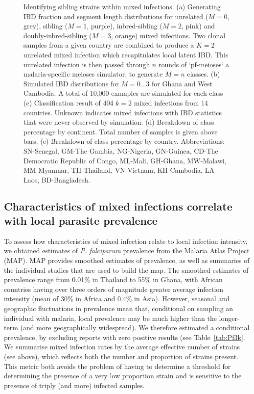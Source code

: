 \documentclass[9pt,lineno]{elife}
\begin{document}
\begin{figure}[h]
\begin{center}
   \caption{Identifying sibling strains within mixed infections.  (a) Generating IBD fraction and segment length distributions for unrelated ($M=0$, grey), sibling ($M=1$, purple), inbred-sibling ($M=2$, pink) and doubly-inbred-sibling ($M=3$, orange) mixed infections. Two clonal samples from a given country are combined to produce a $K=2$ unrelated mixed infection which recapitulates local latent IBD. This unrelated infection is then passed through $n$ rounds of `pf-meioses` a malaria-specific meioses simulator, to generate $M=n$ classes. (b) Simulated IBD distributions for $M=0...3$ for Ghana and West Cambodia. A total of 10,000 examples are simulated for each class (c) Classification result of 404 $k=2$ mixed infections from 14 countries. Unknown indicates mixed infections with IBD statistics that were never observed by simulation. (d) Breakdown of class percentage by continent. Total number of samples is given above bars. (e) Breakdown of class percentage by country. Abbreviations: SN-Senegal, GM-The Gambia, NG-Nigeria, GN-Guinea, CD-The Democratic Republic of Congo, ML-Mali, GH-Ghana, MW-Malawi, MM-Myanmar, TH-Thailand, VN-Vietnam, KH-Cambodia, LA-Laos, BD-Bangladesh.} \label{fig:classify}
   \end{center}
\end{figure}

\subsection{Characteristics of mixed infections correlate with local parasite prevalence}


To assess how characteristics of mixed infection relate to local infection intensity, we obtained estimates of {\it P. falciparum} prevalence from the Malaria Atlas Project (MAP).  MAP provides smoothed estimates of prevalence, as well as summaries of the individual studies that are used to build the map. The smoothed estimates of prevalence  range from 0.01\% in Thailand to 55\% in Ghana, with African countries having over three orders of magnitude greater average infection intensity (mean of 30\% in Africa and 0.4\% in Asia). However, seasonal and geographic fluctuations in prevalence mean that, conditional on sampling an individual with malaria, local prevalence may be much higher than the longer-term (and more geographically widespread).  We therefore estimated a conditional prevalence, by excluding reports with zero positive results (see Table~\ref{tab:Pf3k}.
 We summarise mixed infection rates by the average effective number of strains (see above), which reflects both the number and proportion of strains present.  This metric both avoids the problem of having to determine a threshold for determining the presence of a very low proportion strain and is sensitive to the presence of triply (and more) infected samples.
\end{document}
